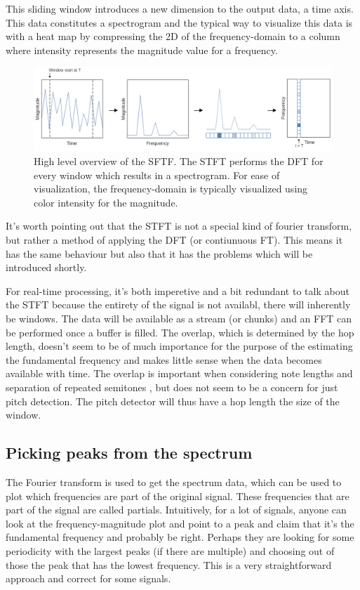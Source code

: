 This sliding window introduces a new dimension to the output data, a time axis. This data constitutes a spectrogram and the typical way to visualize this data is with a heat map by compressing the 2D of the frequency-domain to a column where intensity represents the magnitude value for a frequency. 

\begin{figure}[ht]
    \centering
    \includegraphics[width=\textwidth]{./images/stft.png}
    \caption{High level overview of the SFTF. The STFT performs the DFT for every window which results in a spectrogram. For ease of visualization, the frequency-domain is typically visualized using color intensity for the magnitude. \label{fig:stft}}
\end{figure}

It's worth pointing out that the STFT is not a special kind of fourier transform, but rather a method of applying the DFT (or contiunuous FT). This means it has the same behaviour but also that it has the problems which will be introduced shortly. 

For real-time processing, it's both imperetive and a bit redundant to talk about the STFT because the entirety of the signal is not availabl, there will inherently be windows. The data will be available as a stream (or chunks) and an FFT can be performed once a buffer is filled. The overlap, which is determined by the hop length, doesn't seem to be of much importance for the purpose of the estimating the fundamental frequency and makes little sense when the data becomes available with time. The overlap is important when considering note lengths and separation of repeated semitones , but does not seem to be a concern for just pitch detection. The pitch detector will thus have a hop length the size of the window.

\subsection{Picking peaks from the spectrum}
The Fourier transform is used to get the spectrum data, which can be used to plot which frequencies are part of the original signal. These frequencies that are part of the signal are called partials. Intuitively, for a lot of signals, anyone can look at the frequency-magnitude plot and point to a peak and claim that it's the fundamental frequency and probably be right. Perhaps they are looking for some periodicity with the largest peaks (if there are multiple) and choosing out of those the peak that has the lowest frequency. This is a very straightforward approach and correct for some signals. 
